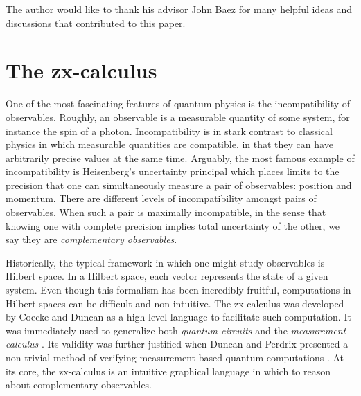 \documentclass[]{amsart}
\theoremstyle{defn}
\begin{document}
The author would like to thank his advisor John Baez for many helpful ideas and discussions that contributed to this paper.   

\section{The zx-calculus}
\label{sec:ZxCalc}

One of the most fascinating features of quantum physics is the incompatibility of observables. Roughly, an observable is a measurable quantity of some system, for instance the spin of a photon.  Incompatibility is in stark contrast to classical physics in which measurable quantities are compatible, in that they can have arbitrarily precise values at the same time.   Arguably, the most famous example of incompatibility is Heisenberg's uncertainty principal which places limits to the precision that one can simultaneously measure a pair of observables: position and momentum.  There are different levels of incompatibility amongst pairs of observables. When such a pair is maximally incompatible, in the sense that knowing one with complete precision implies total uncertainty of the other, we say they are \emph{complementary observables}.  

Historically, the typical framework in which one might study observables is Hilbert space.  In a Hilbert space, each vector represents the state of a given system. Even though this formalism has been incredibly fruitful, computations in Hilbert spaces can be difficult and non-intuitive. The zx-calculus was developed by Coecke and Duncan \cite{CoeckeDuncan_QuantumObsFullPaper} as a high-level language to facilitate such computation.  It was immediately used to generalize both \emph{quantum circuits} \cite{NielsenChuang_QuantumCompInfo}  and the \emph{measurement calculus} \cite{DanosKashefiPanang_MeasurementCalc}. Its validity was further justified when Duncan and Perdrix presented a non-trivial method of verifying measurement-based quantum computations \cite{DuncanPerdrix_RewritingQuantumCompu}.  At its core, the zx-calculus is an intuitive graphical language in which to reason about complementary observables. 
\end{document}
